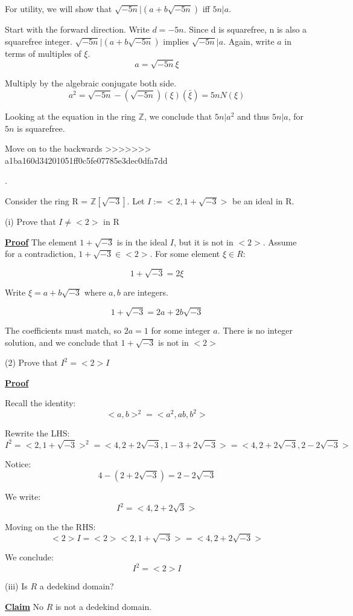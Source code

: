 \documentclass{article}
\newcommand{\new}[1]{
    \vspace{2mm}
    \noindent
    \textbf{
    \underline{#1}}
}
\newcounter{problemcnt}
\newcommand{\Problem}{{
    \vspace{5mm}
    \stepcounter{problemcnt}
    \noindent
    \arabic{problemcnt}. 
}
}
\newcommand{\Proof}{{
    \vspace{2mm}
    \noindent
    \textbf{
    \underline{Proof}}
}
}
\begin{document}
For utility, we will show that 
$\sqrt{-5n}|(a+b\sqrt{-5n})$ iff 
$5n|a$.  

Start with the forward direction. 
Write $d = -5n$. Since d is squarefree, 
n is also a squarefree integer. 
$\sqrt{-5n}|(a+b\sqrt{-5n})$ implies
$\sqrt{-5n}|a$. Again, write $a$ in terms 
of multiples of $\xi$. 
\[
    a = \sqrt{-5n}\xi
\]

Multiply by the algebraic conjugate both side.
\[
    a^2 = \sqrt{-5n}-(\sqrt{-5n})(\xi)(\bar{\xi}) = 5nN(\xi)
\]

Looking at the equation in the ring $\mathbb{Z}$,
we conclude that $5n|a^2$ and thus $5n|a$, for $5n$ is squarefree. 

Move on to the backwards 
>>>>>>> a1ba160d34201051ff0c5fe07785e3dec0dfa7dd

\newpage
\Problem
Consider the ring R = $\mathbb{Z}
[\sqrt{-3}]$. Let 
$I:=<2, 1+\sqrt{-3}>$ be an ideal in R.

\vspace{2mm}
(i) Prove that $I\neq<2>$ in R 

\Proof The element $1 + \sqrt{-3}$ 
is in the ideal $I$, but it is not in 
$<2>$. Assume for a contradiction, 
$1+\sqrt{-3} \in <2>$. For some element 
$\xi \in R$:

\[
    1+\sqrt{-3} = 2\xi
\]

Write $\xi = a+b\sqrt{-3}$ where $a, b$ are 
integers. 

\[
   1+\sqrt{-3} = 2a+2b\sqrt{-3} 
\]

The coefficients must match, so 
$2a = 1$ for some integer $a$. There is 
no integer solution, and we conclude 
that $1+\sqrt{-3}$ is not in $<2>$


(2) Prove that $I^2 = <2>I$

\Proof
Recall the identity:
\[
    <a, b>^2 = <a^2, ab, b^2>
\]

Rewrite the LHS:
\[
    I^2 = <2, 1+\sqrt{-3}>^2
    =<4, 2+2\sqrt{-3}, 1-3+2\sqrt{-3}>
    =<4, 2+2\sqrt{-3}, 2-2\sqrt{-3}>
\]

Notice:
\[
    4-(2+2\sqrt{-3}) = 2-2\sqrt{-3}
\]

We write:
\[
    I^2 = <4, 2+2\sqrt{3}>
\]

Moving on the the RHS:
\[
    <2>I = <2><2, 1+\sqrt{-3}> = <4, 2+2\sqrt{-3}>
\]

We conclude:
\[
    I^2 = <2>I
\]

(iii) Is $R$ a dedekind domain?

\new{Claim} No $R$ is not a dedekind domain.
\end{document}
